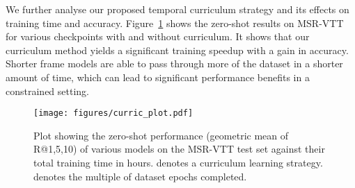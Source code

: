 \documentclass[10pt,twocolumn,letterpaper]{article}
\begin{document}
 We further analyse our proposed temporal curriculum strategy and its effects on training time and accuracy. Figure~\ref{fig:curric} shows the zero-shot results on MSR-VTT for various checkpoints with and without curriculum. It shows that our curriculum method yields a significant training speedup with a gain in accuracy. Shorter frame models are able to pass through more of the dataset in a shorter amount of time, which can lead to significant performance benefits in a constrained setting.


\begin{figure}
    \centering
    \texttt{[image: figures/curric\_plot.pdf]}
    \caption{Plot showing the zero-shot performance (geometric mean of R@{1,5,10}) of various models on the MSR-VTT test set against their total training time in hours.  denotes a curriculum learning strategy.  denotes the multiple of dataset epochs completed.}
    \label{fig:curric}
\end{figure}
\end{document}
